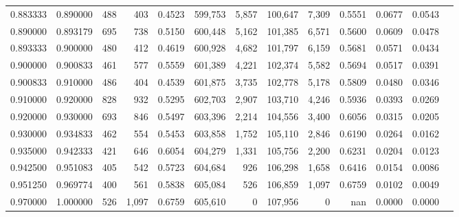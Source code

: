 \begin{tabular}{rrrrrrrrrrrrr}
0.883333 & 0.890000 &    488 &   403 &                                     0.4523 & 599,753 &   5,857 & 100,647 &   7,309 & 0.5551 & 0.0677 & 0.0543 \\
0.890000 & 0.893179 &    695 &   738 &                                     0.5150 & 600,448 &   5,162 & 101,385 &   6,571 & 0.5600 & 0.0609 & 0.0478 \\
0.893333 & 0.900000 &    480 &   412 &                                     0.4619 & 600,928 &   4,682 & 101,797 &   6,159 & 0.5681 & 0.0571 & 0.0434 \\
0.900000 & 0.900833 &    461 &   577 &                                     0.5559 & 601,389 &   4,221 & 102,374 &   5,582 & 0.5694 & 0.0517 & 0.0391 \\
0.900833 & 0.910000 &    486 &   404 &                                     0.4539 & 601,875 &   3,735 & 102,778 &   5,178 & 0.5809 & 0.0480 & 0.0346 \\
0.910000 & 0.920000 &    828 &   932 &                                     0.5295 & 602,703 &   2,907 & 103,710 &   4,246 & 0.5936 & 0.0393 & 0.0269 \\
0.920000 & 0.930000 &    693 &   846 &                                     0.5497 & 603,396 &   2,214 & 104,556 &   3,400 & 0.6056 & 0.0315 & 0.0205 \\
0.930000 & 0.934833 &    462 &   554 &                                     0.5453 & 603,858 &   1,752 & 105,110 &   2,846 & 0.6190 & 0.0264 & 0.0162 \\
0.935000 & 0.942333 &    421 &   646 &                                     0.6054 & 604,279 &   1,331 & 105,756 &   2,200 & 0.6231 & 0.0204 & 0.0123 \\
0.942500 & 0.951083 &    405 &   542 &                                     0.5723 & 604,684 &     926 & 106,298 &   1,658 & 0.6416 & 0.0154 & 0.0086 \\
0.951250 & 0.969774 &    400 &   561 &                                     0.5838 & 605,084 &     526 & 106,859 &   1,097 & 0.6759 & 0.0102 & 0.0049 \\
0.970000 & 1.000000 &    526 & 1,097 &                                     0.6759 & 605,610 &       0 & 107,956 &       0 &    nan & 0.0000 & 0.0000 \\
\bottomrule
\end{tabular}

